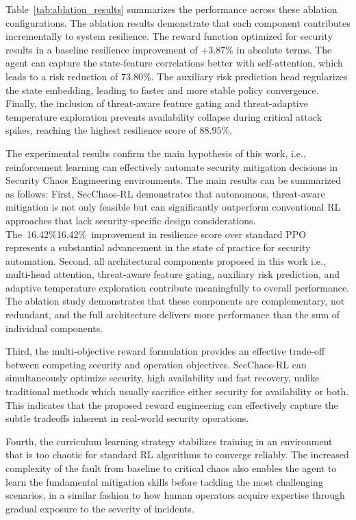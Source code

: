 \documentclass[conference,10pt]{IEEEtran}
\begin{document}
		Table~\ref{tab:ablation_results} summarizes the performance across these ablation configurations. The ablation results demonstrate that each component contributes incrementally to system resilience. The reward function optimized for security results in a baseline resilience improvement of $+3.87\%$ in absolute terms. The agent can capture the state-feature correlations better with self-attention, which leads to a risk reduction of $73.80\%$. The auxiliary risk prediction head regularizes the state embedding, leading to faster and more stable policy convergence. Finally, the inclusion of threat-aware feature gating and threat-adaptive temperature exploration prevents availability collapse during critical attack spikes, reaching the highest resilience score of $88.95\%$.

	The experimental results confirm the main hypothesis of this work, i.e., reinforcement learning can effectively automate security mitigation decisions in Security Chaos Engineering environments. The main results can be summarized as follows: 
	First, SecChaos-RL demonstrates that autonomous, threat-aware mitigation is not only feasible but can significantly outperform conventional RL approaches that lack security-specific design considerations. The 16.42\%16.42\% improvement in resilience score over standard PPO represents a substantial advancement in the state of practice for security automation.
	Second, all architectural components proposed in this work i.e., multi-head attention, threat-aware feature gating, auxiliary risk prediction, and adaptive temperature exploration contribute meaningfully to overall performance. The ablation study demonstrates that these components are complementary, not redundant, and the full architecture delivers more performance than the sum of individual components.
	
Third, the multi-objective reward formulation provides an effective trade-off between competing security and operation objectives. SecChaos-RL can simultaneously optimize security, high availability and fast recovery, unlike traditional methods which usually sacrifice either security for availability or both. This indicates that the proposed reward engineering can effectively capture the subtle tradeoffs inherent in real-world security operations.

Fourth, the curriculum learning strategy stabilizes training in an environment that is too chaotic for standard RL algorithms to converge reliably. The increased complexity of the fault from baseline to critical chaos also enables the agent to learn the fundamental mitigation skills before tackling the most challenging scenarios, in a similar fashion to how human operators acquire expertise through gradual exposure to the severity of incidents.
	
\end{document}
